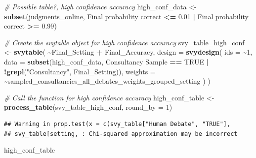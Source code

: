 \documentclass[
]{article}
\newenvironment{Shaded}{\begin{snugshade}}{\end{snugshade}}
\newcommand{\AttributeTok}[1]{\textcolor[rgb]{0.13,0.29,0.53}{#1}}
\newcommand{\CommentTok}[1]{\textcolor[rgb]{0.56,0.35,0.01}{\textit{#1}}}
\newcommand{\ConstantTok}[1]{\textcolor[rgb]{0.56,0.35,0.01}{#1}}
\newcommand{\DecValTok}[1]{\textcolor[rgb]{0.00,0.00,0.81}{#1}}
\newcommand{\FloatTok}[1]{\textcolor[rgb]{0.00,0.00,0.81}{#1}}
\newcommand{\FunctionTok}[1]{\textcolor[rgb]{0.13,0.29,0.53}{\textbf{#1}}}
\newcommand{\NormalTok}[1]{#1}
\newcommand{\OtherTok}[1]{\textcolor[rgb]{0.56,0.35,0.01}{#1}}
\newcommand{\SpecialCharTok}[1]{\textcolor[rgb]{0.81,0.36,0.00}{\textbf{#1}}}
\newcommand{\StringTok}[1]{\textcolor[rgb]{0.31,0.60,0.02}{#1}}
\begin{document}
\begin{Shaded}
\begin{Highlighting}[]
\CommentTok{\# Possible table?, high confidence accuracy}
\NormalTok{high\_conf\_data }\OtherTok{\textless{}{-}} \FunctionTok{subset}\NormalTok{(judgments\_online, }
                         \StringTok{\textasciigrave{}}\AttributeTok{Final probability correct}\StringTok{\textasciigrave{}} \SpecialCharTok{\textless{}=} \FloatTok{0.01} \SpecialCharTok{|} \StringTok{\textasciigrave{}}\AttributeTok{Final probability correct}\StringTok{\textasciigrave{}} \SpecialCharTok{\textgreater{}=} \FloatTok{0.99}\NormalTok{)}

\CommentTok{\# Create the svytable object for high confidence accuracy}
\NormalTok{svy\_table\_high\_conf }\OtherTok{\textless{}{-}} \FunctionTok{svytable}\NormalTok{(}
  \SpecialCharTok{\textasciitilde{}}\NormalTok{Final\_Setting }\SpecialCharTok{+}\NormalTok{ Final\_Accuracy, }
  \AttributeTok{design =} \FunctionTok{svydesign}\NormalTok{(}
    \AttributeTok{ids =} \SpecialCharTok{\textasciitilde{}}\DecValTok{1}\NormalTok{, }
    \AttributeTok{data =} \FunctionTok{subset}\NormalTok{(high\_conf\_data, }\StringTok{\textasciigrave{}}\AttributeTok{Consultancy Sample}\StringTok{\textasciigrave{}} \SpecialCharTok{==} \ConstantTok{TRUE} \SpecialCharTok{|} \SpecialCharTok{!}\FunctionTok{grepl}\NormalTok{(}\StringTok{"Consultancy"}\NormalTok{, Final\_Setting)),}
    \AttributeTok{weights =} \SpecialCharTok{\textasciitilde{}}\NormalTok{sampled\_consultancies\_all\_debates\_weights\_grouped\_setting}
\NormalTok{  )}
\NormalTok{)}

\CommentTok{\# Call the function for high confidence accuracy}
\NormalTok{high\_conf\_table }\OtherTok{\textless{}{-}} \FunctionTok{process\_table}\NormalTok{(svy\_table\_high\_conf, }\AttributeTok{round\_by =} \DecValTok{1}\NormalTok{)}
\end{Highlighting}
\end{Shaded}

\begin{verbatim}
## Warning in prop.test(x = c(svy_table["Human Debate", "TRUE"],
## svy_table[setting, : Chi-squared approximation may be incorrect
\end{verbatim}

\begin{Shaded}
\begin{Highlighting}[]
\NormalTok{high\_conf\_table}
\end{Highlighting}
\end{Shaded}
\end{document}
